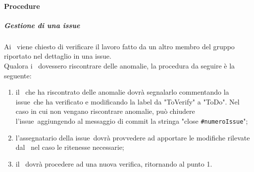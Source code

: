\documentclass[../NormeProgetto.text]{subfiles}
\begin{document}
	\paragraph{Procedure}
	\subparagraph{Gestione di una issue}
		Ai \verificatori\ viene chiesto di verificare il lavoro fatto da un altro membro del gruppo riportato nel dettaglio in una issue\g.\\
		Qualora i \verificatori\ dovessero riscontrare delle anomalie, la procedura da seguire è la seguente:
			\begin{enumerate}
				\item il \verificatore\ che ha riscontrato delle anomalie dovrà segnalarlo commentando la issue\g\ che ha verificato e modificando la label da "ToVerify" a "ToDo". Nel caso in cui non vengano riscontrare anomalie, può chiudere l'issue\g\ aggiungendo al messaggio di commit la stringa "close \texttt{\#numeroIssue}";
				\item l'assegnatario della issue\g\ dovrà provvedere ad apportare le modifiche rilevate dal \verificatore\, nel caso le ritenesse necessarie;
				\item il \verificatore\ dovrà procedere ad una nuova verifica, ritornando al punto 1.
			\end{enumerate}
				
\end{document}
